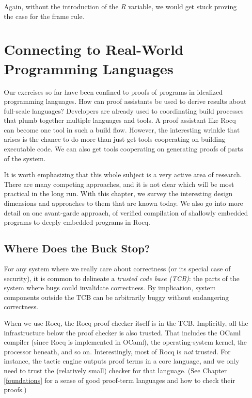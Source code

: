 \documentclass{amsbook}
\theoremstyle{definition}
\theoremstyle{remark}
\numberwithin{section}{chapter}
\numberwithin{equation}{chapter}
\begin{document}
Again, without the introduction of the $R$ variable, we would get stuck proving the case for the frame rule.



\chapter{Connecting to Real-World Programming Languages}

Our exercises so far have been confined to proofs of programs in idealized programming languages.
How can proof assistants be used to derive results about full-scale languages?
Developers are already used to coordinating build processes that plumb together multiple languages and tools.
A proof assistant like Rocq can become one tool in such a build flow.
However, the interesting wrinkle that arises is the chance to do more than just get tools cooperating on building executable code.
We can also get tools cooperating on generating proofs of parts of the system.

It is worth emphasizing that this whole subject is a very active area of research.
There are many competing approaches, and it is not clear which will be most practical in the long run.
With this chapter, we survey the interesting design dimensions and approaches to them that are known today.
We also go into more detail on one avant-garde approach, of verified compilation of shallowly embedded programs to deeply embedded programs in Rocq.

\section{Where Does the Buck Stop?}

For any system where we really care about correctness (or its special case of security), it is common to delineate a \emph{trusted code base (TCB)}: the parts of the system where bugs could invalidate correctness.
By implication, system components outside the TCB can be arbitrarily buggy without endangering correctness.

When we use Rocq, the Rocq proof checker itself is in the TCB.
Implicitly, all the infrastructure below the proof checker is also trusted.
That includes the OCaml compiler (since Rocq is implemented in OCaml), the operating-system kernel, the processor beneath, and so on.
Interestingly, most of Rocq is \emph{not} trusted.
For instance, the tactic engine outputs proof terms in a core language, and we only need to trust the (relatively small) checker for that language.
(See Chapter \ref{foundations} for a sense of good proof-term languages and how to check their proofs.)
\end{document}
